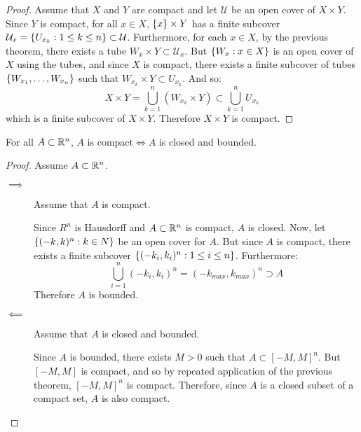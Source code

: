 \documentclass[letterpaper,12pt,fleqn]{article}
\newcommand{\U}{\mathcal{U}}
\begin{document}
\begin{proof}
  Assume that \(X\) and \(Y\) are compact and let \(\U\) be an open cover of \(X\times Y\).  Since \(Y\) is
  compact, for all \(x\in X\), \(\{x\}\times Y\) has a finite subcover \(\U_x=\set{U_{x_k}:1\le k\le n}\subset\U\).
  Furthermore, for each \(x\in X\), by the previous theorem, there exists a tube \(W_x\times Y\subset\U_x\).  But
  \(\{W_x:x\in X\}\) is an open cover of \(X\) using the tubes, and since \(X\) is compact, there exists a finite
  subcover of tubes \(\{W_{x_1},\ldots,W_{x_n}\}\) such that \(W_{x_k}\times Y\subset U_{x_k}\).  And so:
  \[X\times Y=\bigcup_{k=1}^n(W_{x_k}\times Y)\subset\bigcup_{k=1}^nU_{x_k}\]
  which is a finite subcover of \(X\times Y\).  Therefore \(X\times Y\) is compact.
\end{proof}

\begin{theorem}[6.20]
  For all \(A\subset\mathbb{R}^n\), \(A\) is compact\(\iff A\) is closed and bounded.
\end{theorem}

\begin{proof}
  Assume \(A\subset\mathbb{R}^n\).
  \begin{description}
  \item[\(\implies\)] Assume that \(A\) is compact.

    Since \(R^n\) is Hausdorff and \(A\subset\mathbb{R}^n\) is compact, \(A\) is closed.  Now, let \(\{(-k,k)^n:k\in N\}\)
    be an open cover for \(A\).  But since \(A\) is compact, there exists a finite subcover
    \(\{(-k_i,k_i)^n:1\le i\le n\}\).  Furthermore:
    \[\bigcup_{i=1}^n(-k_i,k_i)^n=(-k_{max},k_{max})^n\supset A\]
    Therefore \(A\) is bounded.

  \item[\(\impliedby\)] Assume that \(A\) is closed and bounded.

    Since \(A\) is bounded, there exists \(M>0\) such that \(A\subset[-M,M]^n\).  But \([-M,M]\) is compact, and so
    by repeated application of the previous theorem, \([-M,M]^n\) is compact.  Therefore, since \(A\) is a closed
    subset of a compact set, \(A\) is also compact.
  \end{description}
\end{proof}
\end{document}
